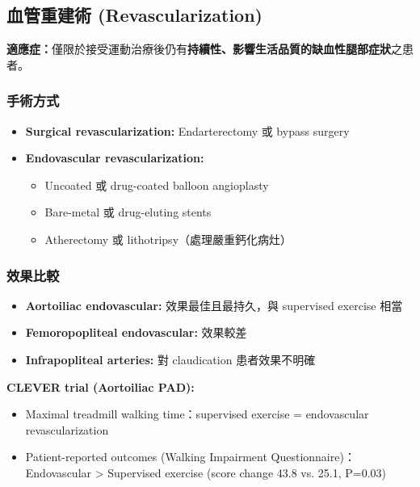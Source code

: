 \documentclass[12pt,a4paper]{article}
\begin{document}

\subsection{血管重建術 (Revascularization)}

\begin{importantbox}
\textbf{適應症：}僅限於接受運動治療後仍有\textbf{持續性、影響生活品質的缺血性腿部症狀}之患者。
\end{importantbox}

\subsubsection{手術方式}

\begin{itemize}[leftmargin=2em]
    \item \textbf{Surgical revascularization:} Endarterectomy 或 bypass surgery
    \item \textbf{Endovascular revascularization:}
    \begin{itemize}
        \item Uncoated 或 drug-coated balloon angioplasty
        \item Bare-metal 或 drug-eluting stents
        \item Atherectomy 或 lithotripsy（處理嚴重鈣化病灶）
    \end{itemize}
\end{itemize}

\subsubsection{效果比較}

\begin{itemize}[leftmargin=2em]
    \item \textbf{Aortoiliac endovascular:} 效果最佳且最持久，與 supervised exercise 相當
    \item \textbf{Femoropopliteal endovascular:} 效果較差
    \item \textbf{Infrapopliteal arteries:} 對 claudication 患者效果不明確
\end{itemize}

\textbf{CLEVER trial (Aortoiliac PAD):}
\begin{itemize}[leftmargin=2em]
    \item Maximal treadmill walking time：supervised exercise = endovascular revascularization
    \item Patient-reported outcomes (Walking Impairment Questionnaire)：\newline Endovascular > Supervised exercise (score change 43.8 vs. 25.1, P=0.03)
\end{itemize}
\end{document}
